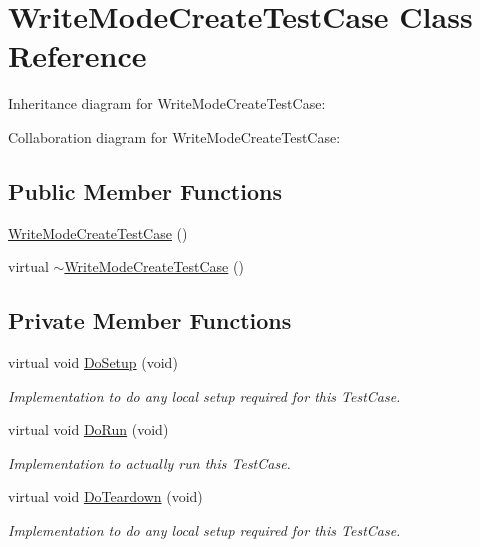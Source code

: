 \hypertarget{classWriteModeCreateTestCase}{}\section{Write\+Mode\+Create\+Test\+Case Class Reference}
\label{classWriteModeCreateTestCase}


Inheritance diagram for Write\+Mode\+Create\+Test\+Case\+:


Collaboration diagram for Write\+Mode\+Create\+Test\+Case\+:
\subsection*{Public Member Functions}
\begin{DoxyCompactItemize}
\item 
\hyperlink{classWriteModeCreateTestCase_a500132572e1b73777e68f6186775b007}{Write\+Mode\+Create\+Test\+Case} ()
\item 
virtual \hyperlink{classWriteModeCreateTestCase_a5750b7f33edf46afbc97fd5ac124509b}{$\sim$\+Write\+Mode\+Create\+Test\+Case} ()
\end{DoxyCompactItemize}
\subsection*{Private Member Functions}
\begin{DoxyCompactItemize}
\item 
virtual void \hyperlink{classWriteModeCreateTestCase_a3a3ac08af7de3c751216bad78fa5082e}{Do\+Setup} (void)
\begin{DoxyCompactList}\small\item\em Implementation to do any local setup required for this Test\+Case. \end{DoxyCompactList}\item 
virtual void \hyperlink{classWriteModeCreateTestCase_a0997ebdb9d907e8ea6e94a7ab96cc5b1}{Do\+Run} (void)
\begin{DoxyCompactList}\small\item\em Implementation to actually run this Test\+Case. \end{DoxyCompactList}\item 
virtual void \hyperlink{classWriteModeCreateTestCase_ae7c47beed305ee1457a49049bf2ccd52}{Do\+Teardown} (void)
\begin{DoxyCompactList}\small\item\em Implementation to do any local setup required for this Test\+Case. \end{DoxyCompactList}\end{DoxyCompactItemize}
